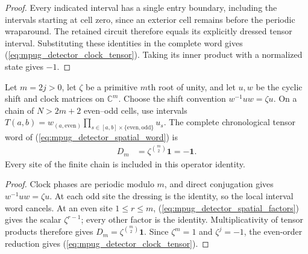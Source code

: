 \begin{proof}\leanok
    Every indicated interval has a single entry boundary, including the
    intervals starting at cell zero, since an exterior cell remains before
    the periodic wraparound. The retained circuit therefore equals its
    explicitly dressed tensor interval. Substituting these identities in
    the complete word gives (\ref{eq:mpug_detector_clock_tensor}).
    Taking its inner product with a normalized state gives $-1$.
\end{proof}

\begin{lemma}
    \label{lem:mpug_detector_clock_tensor}
    \leanok
    Let $m=2j>0$, let $\zeta$ be a primitive $m$th root of unity, and let
    $u,w$ be the cyclic shift and clock matrices on $\mathbb C^m$.
    Choose the shift convention $w^{-1}uw=\zeta u$.
    On a chain of $N>2m+2$ even--odd cells, use intervals
    $T(a,b)=w_{(a,\mathrm{even})}\prod_{s\in[a,b]\times\{\mathrm{even},\mathrm{odd}\}}u_s$.
    The complete chronological tensor word of
    (\ref{eq:mpug_detector_spatial_word}) is
    \begin{align}
        D_m & =\zeta^{\binom m2}\mathbf 1=-\mathbf 1.
        \label{eq:mpug_detector_clock_tensor}
    \end{align}
    Every site of the finite chain is included in this operator identity.
\end{lemma}

\begin{proof}\leanok
    Clock phases are periodic modulo $m$, and direct conjugation gives
    $w^{-1}uw=\zeta u$. At each odd site the dressing is the identity, so
    the local interval word cancels. At an even site $1\leq r\leq m$,
    (\ref{eq:mpug_detector_spatial_factors}) gives the scalar
    $\zeta^{r-1}$; every other factor is the identity.
    Multiplicativity of tensor products therefore gives
    $D_m=\zeta^{\binom m2}\mathbf 1$.
    Since $\zeta^m=1$ and $\zeta^j=-1$, the even-order reduction gives
    (\ref{eq:mpug_detector_clock_tensor}).
\end{proof}

